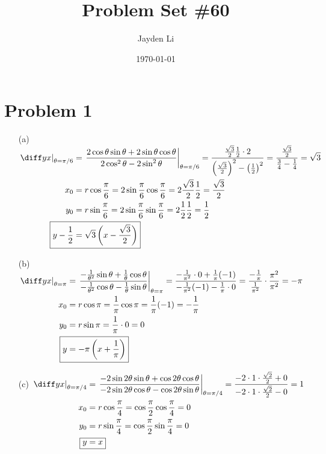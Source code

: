 \documentclass[preview, margin=0.6in]{standalone}
\title{\vspace*{-40pt}Problem Set \#60}
\author{Jayden Li}
\date{\today}
\newcommand*{\problem}[1]{\section*{Problem #1}}
\begin{document}
\fontsize{12pt}{12pt}\selectfont
\setlength{\abovedisplayskip}{\abovedisplayskip/2}
\setlength{\belowdisplayskip}{\belowdisplayskip/2}
\setlength{\parindent}{0pt}
\setlength{\parskip}{2ex plus 0.5ex minus 0.2ex}
\maketitle

\problem{1}
\begin{itemize}
\item[(a)]
$\begin{aligned}[t]
	\left.\diff yx\right|_{\theta=\pi/6}^{}
	&=\left.\frac{2\cos\theta \sin \theta+2\sin \theta\cos \theta}{2\cos^2\theta-2\sin^2\theta}\right|_{\theta=\pi/6}
	=\frac{\frac{\sqrt{3}}{2}\frac{1}{2} \cdot 2}{\left(\frac{\sqrt{3}}{2}\right)^2-\left(\frac{1}{2}\right)^2}
	=\frac{\frac{\sqrt{3}}{2}}{\frac{3}{4}-\frac{1}{4}}
	=\sqrt{3} \\
	x_0
	&=r\cos\frac{\pi}{6}
	=2\sin \frac{\pi}{6}\cos \frac{\pi}{6}
	=2 \frac{\sqrt{3}}{2}\frac{1}{2}
	=\frac{\sqrt{3}}{2} \\
	y_0
	&=r\sin \frac{\pi}{6}
	=2\sin \frac{\pi}{6} \sin \frac{\pi}{6}
	=2 \frac{1}{2}\frac{1}{2}
	=\frac{1}{2} \\
	\Aboxed{y-\frac{1}{2}&=\sqrt{3}\left(x-\frac{\sqrt{3}}{2}\right)}
\end{aligned}$

\item[(b)]
$\begin{aligned}[t]
	\left. \diff yx \right|_{\theta=\pi}
	&=\left.\frac{-\frac{1}{\theta^2}\sin\theta+\frac{1}{\theta}\cos\theta}{-\frac{1}{\theta^2}\cos\theta-\frac{1}{\theta}\sin \theta}\right|_{\theta=\pi}
	=\frac{-\frac{1}{\pi^2}\cdot0+\frac{1}{\pi}(-1)}{-\frac{1}{\pi^2}(-1)-\frac{1}{\pi}\cdot0}
	=\frac{-\frac{1}{\pi}}{\frac{1}{\pi^2}}\cdot \frac{\pi^2}{\pi^2}
	=-\pi \\
	x_0
	&=r\cos\pi
	=\frac{1}{\pi}\cos\pi
	=\frac{1}{\pi}(-1)
	=-\frac{1}{\pi} \\
	y_0
	&=r\sin\pi 
	=\frac{1}{\pi}\cdot0 
	=0 \\
	\Aboxed{y&=-\pi \left(x+\frac{1}{\pi}\right)}
\end{aligned}$

\item[(c)]
$\begin{aligned}[t]
    \left. \diff yx \right|_{\theta=\pi/4}
	&=\left.\frac{-2\sin2\theta \sin\theta+\cos2\theta\cos\theta}{-2\sin2\theta\cos\theta-\cos2\theta\sin\theta}\right|_{\theta=\pi/4}
	=\frac{-2\cdot 1\cdot \frac{\sqrt{2}}{2}+0}{-2\cdot1\cdot \frac{\sqrt{2}}{2}-0}
	=1 \\
	x_0
	&=r\cos \frac{\pi}{4}
	=\cos \frac{\pi}{2} \cos \frac{\pi}{4}
	=0 \\
	y_0
	&=r\sin \frac{\pi}{4}
	=\cos \frac{\pi}{2} \sin \frac{\pi}{4}
	=0 \\
	\Aboxed{y&=x}
\end{aligned}$
\end{itemize}
\end{document}
